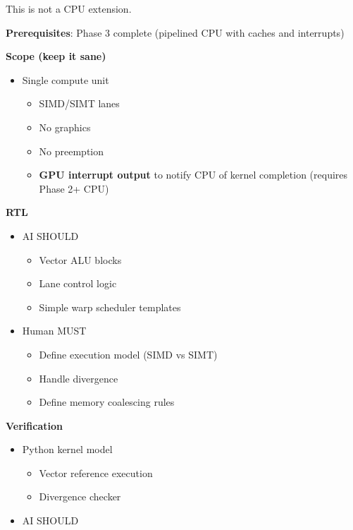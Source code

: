 \begin{record}

\warn{} This is not a CPU extension.

\textbf{Prerequisites}: Phase 3 complete (pipelined CPU with caches and
interrupts)

\textbf{Scope (keep it sane)}

\begin{itemize}
\tightlist
\item
  Single compute unit

  \begin{itemize}
  \tightlist
  \item
    SIMD/SIMT lanes
  \item
    No graphics
  \item
    No preemption
  \item
    \textbf{GPU interrupt output} to notify CPU of kernel completion
    (requires Phase 2+ CPU)
  \end{itemize}
\end{itemize}

\textbf{RTL}

\begin{itemize}
\tightlist
\item
  AI SHOULD

  \begin{itemize}
  \tightlist
  \item
    Vector ALU blocks
  \item
    Lane control logic
  \item
    Simple warp scheduler templates
  \end{itemize}
\item
  Human MUST

  \begin{itemize}
  \tightlist
  \item
    Define execution model (SIMD vs SIMT)
  \item
    Handle divergence
  \item
    Define memory coalescing rules
  \end{itemize}
\end{itemize}

\textbf{Verification}

\begin{itemize}
\tightlist
\item
  Python kernel model

  \begin{itemize}
  \tightlist
  \item
    Vector reference execution
  \item
    Divergence checker
  \end{itemize}
\item
  AI SHOULD


\end{itemize}
\end{record}
